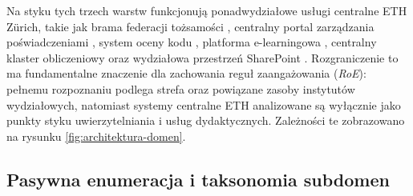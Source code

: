 Na styku tych trzech warstw funkcjonują ponadwydziałowe usługi centralne ETH Zürich, takie jak brama federacji tożsamości  \cite{switch_eduid}, centralny portal zarządzania poświadczeniami  \cite{eth_password_iam}, system oceny kodu , platforma e-learningowa , centralny klaster obliczeniowy  oraz wydziałowa przestrzeń SharePoint . Rozgraniczenie to ma fundamentalne znaczenie dla zachowania reguł zaangażowania (\textit{RoE}): pełnemu rozpoznaniu podlega strefa  oraz powiązane zasoby instytutów wydziałowych, natomiast systemy centralne ETH analizowane są wyłącznie jako punkty styku uwierzytelniania i usług dydaktycznych. Zależności te zobrazowano na rysunku \ref{fig:architektura-domen}.


\subsection{Pasywna enumeracja i taksonomia subdomen}\label{subsec:wyniki-enumeracji}

